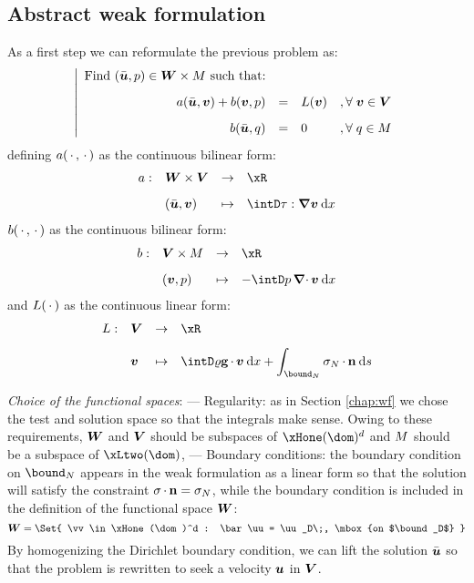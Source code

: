 \subsection{Abstract weak formulation}

As a first step we can reformulate the previous problem as:
\begin{equation*}
\left\vert
\begin{array}{rlll}
\mbox{Find $(\bar{{{\boldsymbol u}}},p)\in \boldsymbol{\boldsymbol{W}}\times{M}$ such that:}\\[2ex]
\displaystyle a(\bar{{{\boldsymbol u}}},{{\boldsymbol v}}) + b({{\boldsymbol v}}, p) &=& L({{\boldsymbol v}})& ,{\forall\;}{{\boldsymbol v}}\in\boldsymbol{{V}}\\[2ex]
\displaystyle b(\bar{{{\boldsymbol u}}},q) &=& 0 & ,{\forall\;} q\in{M}
\end{array}
\right.
\end{equation*}
defining $a(\,{\mathbf\cdot}\,,\,{\mathbf\cdot}\,)$ as the continuous bilinear form:
\begin{equation*}
\begin{array}{rlll}
a :& \xWd\times\xVd & \fromto & \xR \\[2ex]
   & (\bar\uu,\vv)      & \mapsto & \displaystyle \intD \Tvisc:\Grad\vv\dx
\end{array}
\end{equation*}
$b(\,{\mathbf\cdot}\,,\,{\mathbf\cdot}\,)$ as the continuous bilinear form:
\begin{equation*}
\begin{array}{rlll}
b :& \xVd\times\xM  & \fromto & \xR \\[2ex]
   & (\vv , p)      & \mapsto & \displaystyle - \intD p\,\Div\vv\dx
\end{array}
\end{equation*}
and $L(\,{\mathbf\cdot}\,)$ as the continuous linear form:
\begin{equation*}
\begin{array}{rlll}
L :& \xVd   & \fromto & \xR \\[2ex]
   & \vv    & \mapsto & \displaystyle \displaystyle\intD \dens\grav\xDot\vv\dx + \int_{\bound_N}\Stress_N\xDot\n\ds
\end{array}
\end{equation*}

\medskip
\textit{Choice of the functional spaces}:
--- Regularity: as in Section \ref{chap:wf} we chose the test and solution space so that the integrals make sense.
Owing to these requirements, $\boldsymbol{\boldsymbol{W}}$ and $\boldsymbol{{V}}$ should be subspaces of $\xHone(\dom)^d$ and ${M}$ should be a subspace of $\xLtwo(\dom)$,
--- Boundary conditions: the boundary condition on $\bound_N$ appears in the weak formulation as a linear form so that the solution will satisfy the constraint $\sigma\,{\mathbf\cdot}\,\mathbf n = \sigma_N$, while the boundary condition is included in the definition of the functional space $\boldsymbol{\boldsymbol{W}}$:
\begin{equation*}
\xWd = \Set{ \vv \in \xHone(\dom)^d : \bar\uu = \uu_D\;, \mbox{on $\bound_D$} }
\end{equation*}
By homogenizing the Dirichlet boundary condition, we can lift the solution $\bar{{{\boldsymbol u}}}$ so that the problem is rewritten to seek a velocity ${{\boldsymbol u}}$ in $\boldsymbol{{V}}$.

